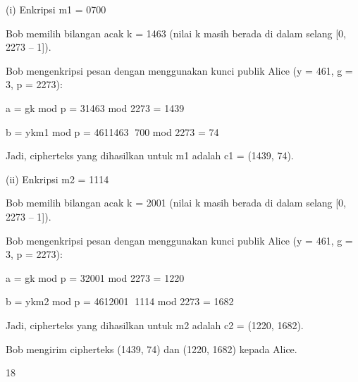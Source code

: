 \documentclass{article}
\begin{document}

(i) Enkripsi m1 = 0700

Bob memilih bilangan acak k = 1463 (nilai k masih berada di dalam selang [0, 2273 – 1]).

Bob mengenkripsi pesan dengan menggunakan kunci publik Alice (y = 461, g = 3, p = 2273):

a = gk mod p = 31463 mod 2273 = 1439

b = ykm1 mod p = 4611463 700 mod 2273 = 74

Jadi, cipherteks yang dihasilkan untuk m1 adalah c1 = (1439, 74).

(ii) Enkripsi m2 = 1114

Bob memilih bilangan acak k = 2001 (nilai k masih berada di dalam selang [0, 2273 – 1]). 

Bob mengenkripsi pesan dengan menggunakan kunci publik Alice (y = 461, g = 3, p = 2273):

a = gk mod p = 32001 mod 2273 = 1220

b = ykm2 mod p = 4612001 1114 mod 2273 = 1682

Jadi, cipherteks yang dihasilkan untuk m2 adalah c2 = (1220, 1682).

Bob mengirim cipherteks (1439, 74) dan (1220, 1682) kepada Alice.

18
\end{document}
